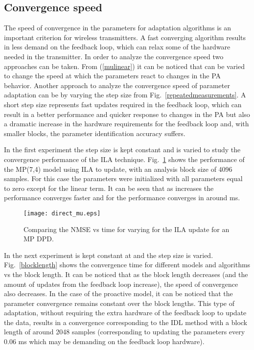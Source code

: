 \documentclass[journal]{IEEEtran}
\begin{document}
\subsection{Convergence speed}
The speed of convergence in the parameters for adaptation algorithms is an important criterion for wireless transmitters. A fast converging algorithm results in less demand on the feedback loop, which can relax some of the hardware needed in the transmitter. In order to analyze the convergence speed two approaches can be taken. From (\ref{mulinear}) it can be noticed that  can be varied to change the speed at which the parameters react to changes in the PA behavior. Another approach to analyze the convergence speed of parameter adaptation can be by varying the step size  from Fig.~\ref{repeatedmeasurements}. A short step size represents fast updates required in the feedback loop, which can result in a better performance and quicker response to changes in the PA but also a dramatic increase in the hardware requirements for the feedback loop and, with smaller blocks, the parameter identification accuracy suffers.

In the first experiment the step size is kept constant and  is varied to study the convergence performance of the ILA technique. Fig.~\ref{mufigure} shows the performance of the MP(7,4) model using ILA to update, with an analysis block size of 4096 samples. For this case the parameters were initialized with all parameters equal to zero except for the linear term. It can be seen that as  increases the performance converges faster and for  the performance converges in around  ms.

\begin{figure}
\centering
\texttt{[image: direct\_mu.eps]}
\caption{Comparing the NMSE vs time for varying  for the ILA update for an MP DPD.} \label{mufigure}
\end{figure}

In the next experiment  is kept constant at  and the step size is varied. Fig.~\ref{blocklength} shows the convergence time for different models and algorithms vs the block length. It can be noticed that as the block length decreases (and the amount of updates from the feedback loop increase), the speed of convergence also decreases. In the case of the proactive model, it can be noticed that the parameter convergence remains constant over the block lengths. This type of adaptation, without requiring the extra hardware of the feedback loop to update the data, results in a convergence corresponding to the IDL method with a block length of around 2048 samples (corresponding to updating the parameters every 0.06 ms which may be demanding on the feedback loop hardware).
\end{document}
